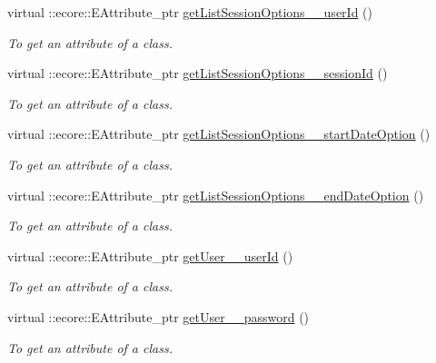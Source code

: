 \begin{DoxyCompactItemize}
virtual ::ecore::EAttribute\_\-ptr \hyperlink{classUMS__Data_1_1UMS__DataPackage_a93f54b74337ae44b44992a2f4bcab444}{getListSessionOptions\_\-\_\-userId} ()
\begin{DoxyCompactList}\small\item\em To get an attribute of a class. \item\end{DoxyCompactList}\item 
virtual ::ecore::EAttribute\_\-ptr \hyperlink{classUMS__Data_1_1UMS__DataPackage_a8be2c402cfcdd8295cdf48081be22a23}{getListSessionOptions\_\-\_\-sessionId} ()
\begin{DoxyCompactList}\small\item\em To get an attribute of a class. \item\end{DoxyCompactList}\item 
virtual ::ecore::EAttribute\_\-ptr \hyperlink{classUMS__Data_1_1UMS__DataPackage_ab0d20e5e38b8431e1d420d2443e3472c}{getListSessionOptions\_\-\_\-startDateOption} ()
\begin{DoxyCompactList}\small\item\em To get an attribute of a class. \item\end{DoxyCompactList}\item 
virtual ::ecore::EAttribute\_\-ptr \hyperlink{classUMS__Data_1_1UMS__DataPackage_aaf1f30a28523f6cb3c75279829778706}{getListSessionOptions\_\-\_\-endDateOption} ()
\begin{DoxyCompactList}\small\item\em To get an attribute of a class. \item\end{DoxyCompactList}\item 
virtual ::ecore::EAttribute\_\-ptr \hyperlink{classUMS__Data_1_1UMS__DataPackage_a52c92243422dd180370c74fe159fe5a9}{getUser\_\-\_\-userId} ()
\begin{DoxyCompactList}\small\item\em To get an attribute of a class. \item\end{DoxyCompactList}\item 
virtual ::ecore::EAttribute\_\-ptr \hyperlink{classUMS__Data_1_1UMS__DataPackage_ae1547d43e15cafd26937598b976aeae8}{getUser\_\-\_\-password} ()
\begin{DoxyCompactList}\small\item\em To get an attribute of a class. \item\end{DoxyCompactList}\item 

\end{DoxyCompactItemize}
